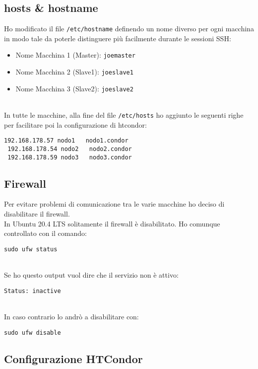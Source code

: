  \subsection{hosts \& hostname}
 \label{sec:hosts}
 
 Ho modificato il file \lstinline[style=cmd]|/etc/hostname| definendo un nome diverso per ogni macchina in modo
 tale da poterle distinguere pi\`{u} facilmente durante le sessioni SSH:
 
 \begin{itemize}
 	\item Nome Macchina 1 (Master): \lstinline[style=cmd]|joemaster|
 	\item Nome Macchina 2 (Slave1): \lstinline[style=cmd]|joeslave1|
 	\item Nome Macchina 3 (Slave2): \lstinline[style=cmd]|joeslave2|
 \end{itemize} 
\ \\
In tutte le macchine, alla fine del file \lstinline[style=cmd]|/etc/hosts| ho aggiunto le seguenti righe per
facilitare poi la configurazione di htcondor:

\begin{lstlisting}[style=cmd]
 192.168.178.57	nodo1	nodo1.condor
 192.168.178.54	nodo2	nodo2.condor
 192.168.178.59	nodo3	nodo3.condor
\end{lstlisting}

\subsection{Firewall}

Per evitare problemi di comunicazione tra le varie macchine ho deciso di disabilitare il firewall.\\
In Ubuntu 20.4 LTS solitamente il firewall \`{e} disabilitato. Ho comunque controllato con il comando:

\begin{lstlisting}[style=cmd]
 sudo ufw status
\end{lstlisting}
\ \\
Se ho questo output vuol dire che il servizio non \`{e} attivo:

\begin{lstlisting}[style=output]
 Status: inactive
\end{lstlisting}
\ \\
In caso contrario lo andr\`{o} a disabilitare con:

\begin{lstlisting}[style=cmd]
 sudo ufw disable
\end{lstlisting}

\subsection{Configurazione HTCondor}